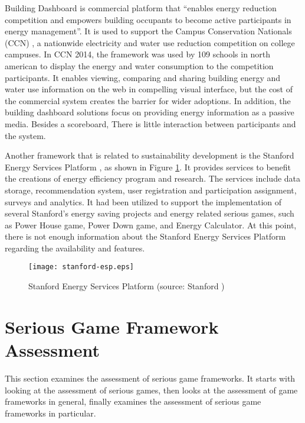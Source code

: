 Building Dashboard is commercial platform that ``enables energy reduction competition and empowers building occupants to become active participants in energy management''. It is used to support the Campus Conservation Nationals (CCN) \cite{competetoreduce}, a nationwide electricity and water use reduction competition on college campuses. In CCN 2014, the framework was used by 109 schools in north american to display the energy and water consumption to the competition participants. It enables viewing, comparing and sharing building energy
and water use information on the web in compelling visual interface, but the
cost of the commercial system creates the barrier for wider adoptions. In addition, the
building dashboard solutions focus on providing energy information as
a passive media. Besides a scoreboard, There is little interaction between participants
and the system.

Another framework that is related to sustainability development is the Stanford Energy Services Platform \cite{Armel-2012}, as shown in Figure \ref{fig:stanford-platform}. It provides services to benefit the creations of energy efficiency program and research. The services include data storage, recommendation system, user registration and participation assignment, surveys and analytics. It had been utilized to support
the implementation of several Stanford's energy saving projects and energy related serious games, such as Power House game, Power Down game, and Energy Calculator. At this point, there is not enough information about the Stanford Energy Services Platform regarding the availability and features. 

\begin{figure}[htbp]
	\centering
		\texttt{[image: stanford-esp.eps]}
		\caption{Stanford Energy Services Platform (source: Stanford \cite{Armel-2012})}
		\label{fig:stanford-platform}
\end{figure}
 
\section{Serious Game Framework Assessment}

This section examines the assessment of serious game frameworks. It starts with looking at the assessment of serious games, then looks at the assessment of game frameworks in general, finally examines the assessment of serious game frameworks in particular.

